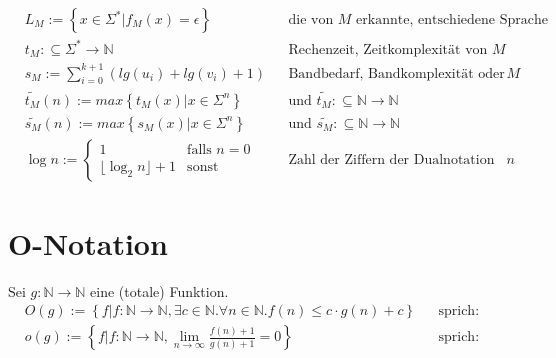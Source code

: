 \documentclass[10pt,oneside,a4paper]{scrartcl}
\begin{document}
    \begin{align}
    &L_M := \left\{x\in\Sigma^*|f_M(x)=\epsilon\right\}
        && \text{die von $M$ erkannte, entschiedene Sprache}\\
    &t_M :\subseteq\Sigma^*\longrightarrow\mathbb{N}
        && \text{Rechenzeit, Zeitkomplexität von $M$}\\
    &s_M := \sum_{i=0}^{k+1} (lg(u_i) + lg(v_i) + 1)
        &&\text{Bandbedarf, Bandkomplexität oder Speicherkomplexität von $M$}\\
    &\tilde{t_M}(n) := max\left\{t_M(x) | x\in\Sigma^n\right\}
        &&\text{und }\tilde{t_M}:\subseteq\mathbb{N}\longrightarrow\mathbb{N}\\
    &\tilde{s_M}(n) := max\left\{s_M(x) | x\in\Sigma^n\right\}
        &&\text{und }\tilde{s_M}:\subseteq\mathbb{N}\longrightarrow\mathbb{N}\\
    &\log{n} := \left\{\begin{array}{ll}
        1 & \text{falls }n=0\\
        \lfloor\log_2{n}\rfloor + 1 & \text{sonst}
    \end{array}\right.
        && \text{Zahl der Ziffern der Dualnotation von $n$}
    \end{align}

\section{O-Notation}

    Sei $g : \mathbb{N}\longrightarrow\mathbb{N}$ eine (totale) Funktion.
    \begin{align}
    &O(g) := \left\{f | f : \mathbb{N}\longrightarrow\mathbb{N},
                    \exists c \in \mathbb{N} .
                    \forall n \in \mathbb{N} .
                    f(n) \leq c \cdot g(n) + c
             \right\}
        && \text{sprich: ``groß Oh von g''}\\
    &o(g) := \left\{f | f : \mathbb{N}\longrightarrow\mathbb{N},
                    \lim_{n\rightarrow\infty} \frac{f(n) + 1}{g(n) + 1} = 0
             \right\}
        && \text{sprich: ``klein oh von g''}
    \end{align}
\end{document}
